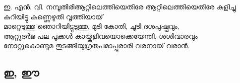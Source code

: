 \begin{enumerate}

\begin{slokam}{\VKm}{ഇ. എൻ. വി. നമ്പൂതിരി}{ആറ്റിലെത്തിയെതിരേ}
ആറ്റിലെത്തിയെതിരേ കുളിച്ചു കുറിയിട്ടു കണ്ണെഴുതി വൃത്തിയായ്\\
മാറ്റെടുത്തു ഞൊറിയിട്ടുടുത്തു, മുടി കോതി, ചൂടി ദശപുഷ്പവും,\\
ആറ്റുദർഭ പല പൂക്കൾ കായ്കളിവയൊക്കെയേന്തി, ശശിവാരവും \\
നോറ്റുകൊണ്ടുമ തുടങ്ങിയുഗ്രതപമാപ്പുരാരി വരനായ് വരാൻ.
\end{slokam}


\end{enumerate}

\subsection{ഇ, ഈ}


